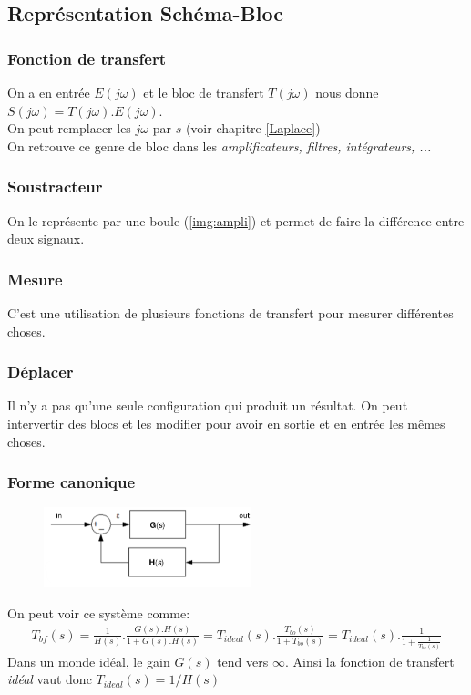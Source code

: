 \documentclass{report}
\begin{document}
\subsection{Représentation Schéma-Bloc}

\subsubsection{Fonction de transfert}
On a en entrée $E(j\omega)$ et le bloc de transfert $T(j\omega)$ nous donne $S(j\omega) = T(j\omega) . E(j\omega)$.\\
On peut remplacer les $j \omega$ par $s$ (voir chapitre \ref{Laplace})\\
On retrouve ce genre de bloc dans les \textit{amplificateurs, filtres, intégrateurs, ...}

\subsubsection{Soustracteur} 
On le représente par une boule (\ref{img:ampli}) et permet de faire la différence entre deux signaux.

\subsubsection{Mesure}
C'est une utilisation de plusieurs fonctions de transfert pour mesurer différentes choses.

\subsubsection{Déplacer}
Il n'y a pas qu'une seule configuration qui produit un résultat. On peut intervertir des blocs et les modifier pour avoir en sortie et en entrée les mêmes choses.

\subsubsection{Forme canonique}
\begin{figure}[H]
\centering
\includegraphics[width=6cm]{img/Bloc2.png}
\end{figure}
On peut voir ce système comme:
\begin{align*}
T_{bf}(s) = \frac{1}{H(s)}.\frac{G(s) . H(s)}{1 + G(s). H(s)} = T_{ideal} (s) . \frac{T_{bo}(s)}{1+T_{bo}(s)} = T_{ideal} (s) . \frac{1}{1 + \frac{1}{T_{bo}(s)}}
\end{align*}
Dans un monde idéal, le gain $G(s)$ tend vers $\infty$. Ainsi la fonction de transfert \textit{idéal} vaut donc $T_{ideal}(s) = 1/H(s)$
\end{document}
